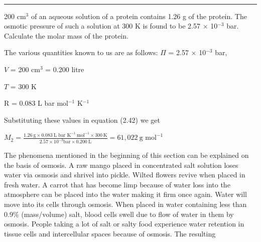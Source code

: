 \documentclass[11pt,a4paper]{article}
\begin{document}
\vspace{12pt}
\begin{tcolorbox}[enhanced,colback=white,colframe=gray!40,boxrule=0.8pt,arc=2mm,left=24pt,right=8pt,top=4pt,bottom=6pt,boxsep=0pt,drop fuzzy shadow=gray!40,overlay={\fill[SkyBlue] (frame.south west) rectangle ([xshift=14pt]frame.north west);}]
\noindent\begin{minipage}[t]{0.17\linewidth}
\\[-3pt]
{\color{DeepSkyBlue3}\rule{\linewidth}{0.8pt}}
\end{minipage}\hfill
\begin{minipage}[t]{0.81\linewidth}
200 cm$^3$ of an aqueous solution of a protein contains 1.26 g of the protein. The osmotic pressure of such a solution at 300 K is found to be 2.57 $\times$ 10$^{-3}$ bar. Calculate the molar mass of the protein.
\end{minipage}

\vspace{6pt}
\noindent\begin{minipage}[t]{0.17\linewidth}
\end{minipage}\hfill
\begin{minipage}[t]{0.81\linewidth}
The various quantities known to us are as follows: $\Pi$ = 2.57 $\times$ 10$^{-3}$ bar,

\hspace*{1.5em}$V$ = 200 cm$^3$ = 0.200 litre

\hspace*{1.5em}$T$ = 300 K

\hspace*{1.5em}R = 0.083 L bar mol$^{-1}$ K$^{-1}$

Substituting these values in equation (2.42) we get

\hspace*{1.5em}$\displaystyle M_2 = \frac{1.26\ \text{g} \times 0.083\ \text{L bar K}^{-1}\ \text{mol}^{-1} \times 300\ \text{K}}{2.57{\times}10^{-3}\text{bar} \times 0.200\ \text{L}} = 61{,}022\ \text{g mol}^{-1}$
\end{minipage}
\end{tcolorbox}

\vspace{14pt}
\noindent\hfill\begin{minipage}[t]{0.735\textwidth}
\hspace*{1.5em}The phenomena mentioned in the beginning of this section can be explained on the basis of osmosis. A raw mango placed in concentrated salt solution loses water via osmosis and shrivel into pickle. Wilted flowers revive when placed in fresh water. A carrot that has become limp because of water loss into the atmosphere can be placed into the water making it firm once again. Water will move into its cells through osmosis. When placed in water containing less than 0.9\% (mass/volume) salt, blood cells swell due to flow of water in them by osmosis. People taking a lot of salt or salty food experience water retention in tissue cells and intercellular spaces because of osmosis. The resulting
\end{minipage}
\end{document}
